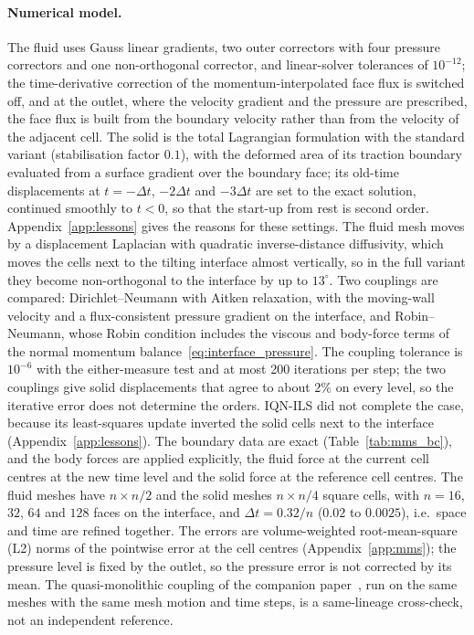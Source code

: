 \paragraph{Numerical model.}
The fluid uses Gauss linear gradients, two outer correctors with four pressure correctors and one non-orthogonal corrector, and linear-solver tolerances of $10^{-12}$; the time-derivative correction of the momentum-interpolated face flux is switched off, and at the outlet, where the velocity gradient and the pressure are prescribed, the face flux is built from the boundary velocity rather than from the velocity of the adjacent cell.
The solid is the total Lagrangian formulation with the standard variant (stabilisation factor $0.1$), with the deformed area of its traction boundary evaluated from a surface gradient over the boundary face; its old-time displacements at $t = -\Delta t$, $-2\Delta t$ and $-3\Delta t$ are set to the exact solution, continued smoothly to $t < 0$, so that the start-up from rest is second order.
Appendix~\ref{app:lessons} gives the reasons for these settings.
The fluid mesh moves by a displacement Laplacian with quadratic inverse-distance diffusivity, which moves the cells next to the tilting interface almost vertically, so in the full variant they become non-orthogonal to the interface by up to $13^\circ$.
Two couplings are compared: Dirichlet--Neumann with Aitken relaxation, with the moving-wall velocity and a flux-consistent pressure gradient on the interface, and Robin--Neumann, whose Robin condition includes the viscous and body-force terms of the normal momentum balance~\eqref{eq:interface_pressure}.
The coupling tolerance is $10^{-6}$ with the either-measure test and at most 200 iterations per step; the two couplings give solid displacements that agree to about $2\%$ on every level, so the iterative error does not determine the orders.
IQN-ILS did not complete the case, because its least-squares update inverted the solid cells next to the interface (Appendix~\ref{app:lessons}).
The boundary data are exact (Table~\ref{tab:mms_bc}), and the body forces are applied explicitly, the fluid force at the current cell centres at the new time level and the solid force at the reference cell centres.
The fluid meshes have $n \times n/2$ and the solid meshes $n \times n/4$ square cells, with $n = 16$, $32$, $64$ and $128$ faces on the interface, and $\Delta t = 0.32/n$ ($0.02$ to $0.0025$), i.e.\ space and time are refined together.
The errors are volume-weighted root-mean-square (L2) norms of the pointwise error at the cell centres (Appendix~\ref{app:mms}); the pressure level is fixed by the outlet, so the pressure error is not corrected by its mean.
The quasi-monolithic coupling of the companion paper~\citep{CardiffBatistic2026QM}, run on the same meshes with the same mesh motion and time steps, is a same-lineage cross-check, not an independent reference.

